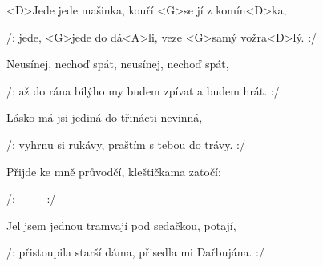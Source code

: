 

\zr
<D>Jede jede mašinka, kouří <G>se jí z komín<D>ka,

/: jede, <G>jede do dá<A>li, veze <G>samý vožra<D>lý. :/
\kr

\zs
Neusínej, nechoď spát, neusínej, nechoď spát,

/: až do rána bílýho my budem zpívat a budem hrát. :/
\ks

\zs
Lásko má jsi jediná do třinácti nevinná,

/: vyhrnu si rukávy, praštím s tebou do trávy. :/
\ks

\zr \kr

\zs
Přijde ke mně průvodčí, kleštičkama zatočí:

/:  --  --  -- 
 :/
\ks

\zr \kr

\zs
Jel jsem jednou tramvají pod sedačkou, potají,

/: přistoupila starší dáma, přisedla mi Dařbujána. :/
\ks

\zr \kr

\kp






















